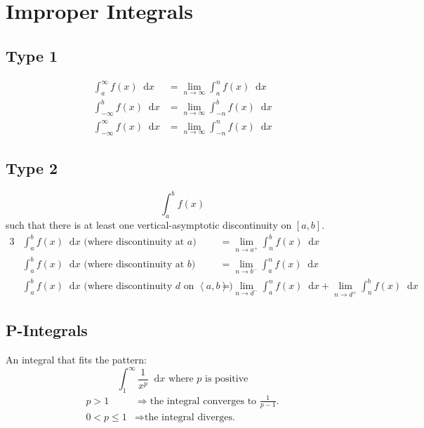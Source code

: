 \documentclass[12pt]{article}
\renewcommand*{\implies}{\Rightarrow}
\newcommand*{\D}[1]{\mathop{}\!\mathrm{d}#1}
\newcommand*{\fixmath}{%
  \makebox{}\vspace{\glueexpr-\baselineskip-\abovedisplayskip}}
\newenvironment{fixaskip}{\setlength{\abovedisplayskip}{0pt}\fixmath%
  \ignorespaces}{\ignorespacesafterend}
\newenvironment{fixskip}{\setlength{\abovedisplayskip}{0pt}%
  \setlength{\belowdisplayskip}{0pt}\fixmath\ignorespaces}%
  {\ignorespacesafterend}
\begin{document}
\section*{Improper Integrals}
\subsection*{Type 1}
\begin{fixskip}
  \begin{align*}
    \int_a^\infty f(x) \D{x} &= \lim_{n \to \infty} \int_a^n f(x) \D{x}\\
    \int_{-\infty}^b f(x) \D{x} &= \lim_{n \to \infty} \int_{-n}^b f(x) \D{x}\\
    \int_{-\infty}^\infty f(x) \D{x} &= \lim_{n \to \infty} \int_{-n}^n f(x)
      \D{x}
  \end{align*}
\end{fixskip}
\subsection*{Type 2}
\begin{fixaskip}
  \[
    \int_a^b f(x)
  \]
\end{fixaskip}
such that there is at least one vertical-asymptotic discontinuity on \([a,b]\).
\begin{alignat*}{3}
  &\int_a^b f(x) \D{x} \text{ (where discontinuity at \(a\)) }
    &&= \lim_{n \to a^+} \int_n^b f(x) \D{x}\\
  &\int_a^b f(x) \D{x} \text{ (where discontinuity at \(b\)) }
    &&= \lim_{n \to b^-} \int_a^n f(x) \D{x}\\
  &\int_a^b f(x) \D{x} \text{ (where discontinuity \(d\) on
    \(\left<a,b\right>\)) } &&= \lim_{n \to d^-} \int_a^n f(x) \D{x} +
    \lim_{n \to d^+} \int_n^b f(x) \D{x}
\end{alignat*}
\subsection*{P-Integrals}
An integral that fits the pattern:
\[
  \int_1^\infty \frac{1}{x^p} \D{x} \text{ where \(p\) is positive}
\]
\begin{fixaskip}
  \begin{align*}
    p > 1 &\implies \text{the integral converges to \(\tfrac{1}{p-1}\).}\\
    0 < p \le 1 &\implies \text{the integral diverges.}
  \end{align*}
\end{fixaskip}
\end{document}
